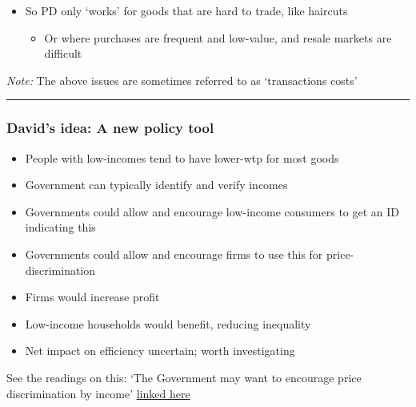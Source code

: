 \documentclass[]{article}
\providecommand{\tightlist}{%
  \setlength{\itemsep}{0pt}\setlength{\parskip}{0pt}}
\begin{document}
\bigskip

\begin{itemize}
\tightlist
\item
  So PD only `works' for goods that are hard to trade, like haircuts

  \begin{itemize}
  \tightlist
  \item
    Or where purchases are frequent and low-value, and resale markets
    are difficult
  \end{itemize}
\end{itemize}

\emph{Note:} The above issues are sometimes referred to as `transactions
costs'

\begin{center}\rule{0.5\linewidth}{\linethickness}\end{center}

\hypertarget{davids-idea-a-new-policy-tool}{%
\subsubsection{David's idea: A new policy
tool}\label{davids-idea-a-new-policy-tool}}

\begin{itemize}
\tightlist
\item
  People with low-incomes tend to have lower-wtp for most goods
\item
  Government can typically identify and verify incomes
\item
  Governments could allow and encourage low-income consumers to get an
  ID indicating this
\item
  Governments could allow and encourage firms to use this for
  price-discrimination
\end{itemize}

\bigskip

\begin{itemize}
\tightlist
\item
  Firms would increase profit
\item
  Low-income households would benefit, reducing inequality
\item
  Net impact on efficiency uncertain; worth investigating
\end{itemize}

See the readings on this: `The Government may want to encourage price
discrimination by income'
\href{https://davidreinstein.wordpress.com/research-and-publications/}{linked
here}
\end{document}
